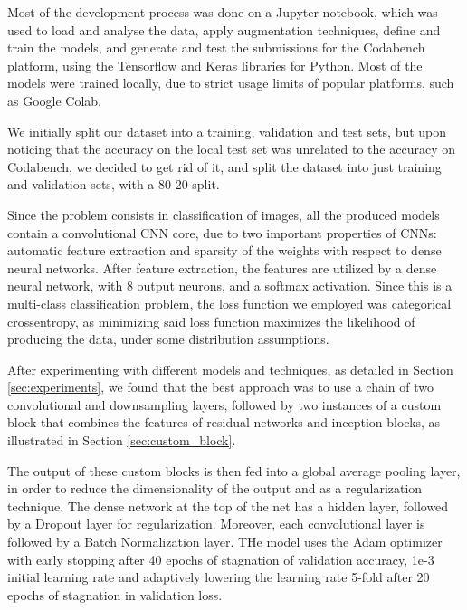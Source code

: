\documentclass[11pt]{article}
\begin{document}
\begin{multicols}{2}


      Most of the development process was done on a Jupyter notebook, which was used to load and analyse the data, apply augmentation techniques, define and train the models, and generate and test the submissions for the Codabench platform, using the Tensorflow and Keras libraries for Python. Most of the models were trained locally, due to strict usage limits of popular platforms, such as Google Colab.

      We initially split our dataset into a training, validation and test sets, but upon noticing that the accuracy on the local test set was unrelated to the accuracy on Codabench, we decided to get rid of it, and split the dataset into just training and validation sets, with a 80-20 split.

      Since the problem consists in classification of images, all the produced models contain a convolutional CNN core, due to two important properties of CNNs: automatic feature extraction and sparsity of the weights with respect to dense neural networks. After feature extraction, the features are utilized by a dense neural network, with 8 output neurons, and a softmax activation. Since this is a multi-class classification problem, the loss function we employed was categorical crossentropy, as minimizing said loss function maximizes the likelihood of producing the data, under some distribution assumptions.

      After experimenting with different models and techniques, as detailed in Section \ref{sec:experiments}, we found that the best approach was to use a chain of two convolutional and downsampling layers, followed by two instances of a custom block that combines the features of residual networks and inception blocks, as illustrated in Section \ref{sec:custom_block}.

      The output of these custom blocks is then fed into a global average
      pooling layer, in order to reduce the dimensionality of the output and as a regularization technique. The dense network at the top of the net has a hidden layer, followed by a Dropout layer for regularization. Moreover, each convolutional layer is followed by a Batch Normalization layer. THe model uses the Adam optimizer with early stopping after 40 epochs of stagnation of validation accuracy, 1e-3 initial learning rate and adaptively lowering the learning rate 5-fold after 20 epochs of stagnation in validation loss.


\end{multicols}
\end{document}
